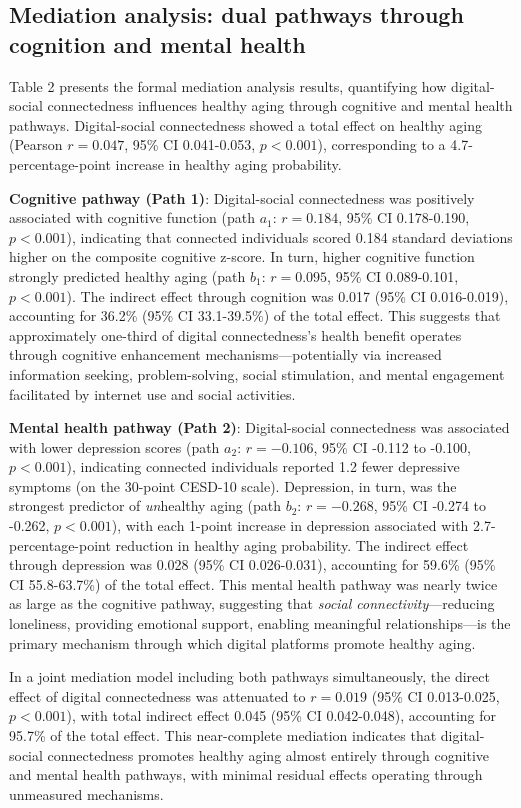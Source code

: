 \documentclass[10pt]{article}
\begin{document}
\subsection*{Mediation analysis: dual pathways through cognition and mental health}

Table 2 presents the formal mediation analysis results, quantifying how digital-social connectedness influences healthy aging through cognitive and mental health pathways. Digital-social connectedness showed a total effect on healthy aging (Pearson $r=0.047$, 95\% CI 0.041-0.053, $p<0.001$), corresponding to a 4.7-percentage-point increase in healthy aging probability.

\textbf{Cognitive pathway (Path 1)}: Digital-social connectedness was positively associated with cognitive function (path $a_1$: $r=0.184$, 95\% CI 0.178-0.190, $p<0.001$), indicating that connected individuals scored 0.184 standard deviations higher on the composite cognitive z-score. In turn, higher cognitive function strongly predicted healthy aging (path $b_1$: $r=0.095$, 95\% CI 0.089-0.101, $p<0.001$). The indirect effect through cognition was 0.017 (95\% CI 0.016-0.019), accounting for 36.2\% (95\% CI 33.1-39.5\%) of the total effect. This suggests that approximately one-third of digital connectedness's health benefit operates through cognitive enhancement mechanisms---potentially via increased information seeking, problem-solving, social stimulation, and mental engagement facilitated by internet use and social activities.

\textbf{Mental health pathway (Path 2)}: Digital-social connectedness was associated with lower depression scores (path $a_2$: $r=-0.106$, 95\% CI -0.112 to -0.100, $p<0.001$), indicating connected individuals reported 1.2 fewer depressive symptoms (on the 30-point CESD-10 scale). Depression, in turn, was the strongest predictor of \textit{un}healthy aging (path $b_2$: $r=-0.268$, 95\% CI -0.274 to -0.262, $p<0.001$), with each 1-point increase in depression associated with 2.7-percentage-point reduction in healthy aging probability. The indirect effect through depression was 0.028 (95\% CI 0.026-0.031), accounting for 59.6\% (95\% CI 55.8-63.7\%) of the total effect. This mental health pathway was nearly twice as large as the cognitive pathway, suggesting that \textit{social connectivity}---reducing loneliness, providing emotional support, enabling meaningful relationships---is the primary mechanism through which digital platforms promote healthy aging.

In a joint mediation model including both pathways simultaneously, the direct effect of digital connectedness was attenuated to $r=0.019$ (95\% CI 0.013-0.025, $p<0.001$), with total indirect effect 0.045 (95\% CI 0.042-0.048), accounting for 95.7\% of the total effect. This near-complete mediation indicates that digital-social connectedness promotes healthy aging almost entirely through cognitive and mental health pathways, with minimal residual effects operating through unmeasured mechanisms.
\end{document}
